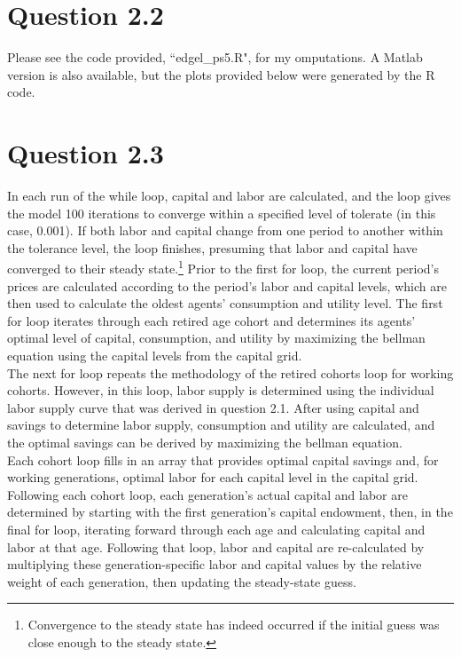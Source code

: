 \documentclass{article}
\begin{document}

\section*{Question 2.2}

Please see the code provided, ``edgel\_ps5.R", for my omputations. A Matlab version is also available, but the plots provided below were generated by the R code.


\section*{Question 2.3}

In each run of the while loop, capital and labor are calculated, and the loop gives the model 100 iterations to converge within a specified level of tolerate (in this case, 0.001). If both labor and capital change from one period to another within the tolerance level, the loop finishes, presuming that labor and capital have converged to their steady state.\footnote{Convergence to the steady state has indeed occurred if the initial guess was close enough to the steady state.} Prior to the first for loop, the current period's prices are calculated according to the period's labor and capital levels, which are then used to calculate the oldest agents' consumption and utility level. The first for loop iterates through each retired age cohort and determines its agents' optimal level of capital, consumption, and utility by maximizing the bellman equation using the capital levels from the capital grid. \\

The next for loop repeats the methodology of the retired cohorts loop for working cohorts. However, in this loop, labor supply is determined using the individual labor supply curve that was derived in question 2.1. After using capital and savings to determine labor supply, consumption and utility are calculated, and the optimal savings can be derived by maximizing the bellman equation. \\

Each cohort loop fills in an array that provides optimal capital savings and, for working generations, optimal labor for each capital level in the capital grid. Following each cohort loop, each generation's actual capital and labor are determined by starting with the first generation's capital endowment, then, in the final for loop, iterating forward through each age and calculating capital and labor at that age. Following that loop, labor and capital are re-calculated by multiplying these generation-specific labor and capital values by the relative weight of each generation, then updating the steady-state guess.
\end{document}
